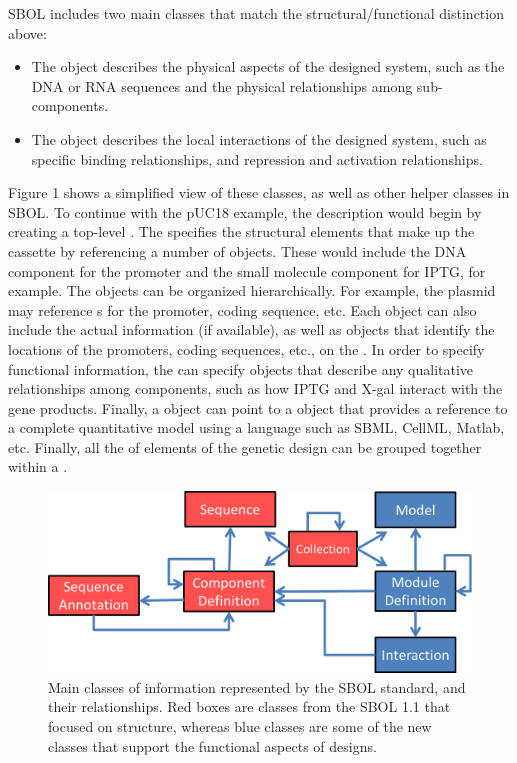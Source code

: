 SBOL includes two main classes that match the structural/functional distinction above:
\begin{itemize}
\item The  object describes the physical aspects of the designed system, such as the DNA or RNA sequences and the physical relationships among sub-components.
\item The  object describes the local interactions of the designed system, such as specific binding relationships, and repression and activation relationships. 
\end{itemize}

Figure 1 shows a simplified view of these classes, as well as other helper classes in SBOL. To continue with the pUC18 example, the description would begin by creating a top-level .  The  specifies the structural elements that make up the cassette by referencing a number of  objects. These would include the DNA component for the promoter and the small molecule component for IPTG, for example.  
The  objects can be organized hierarchically.  For example, the plasmid  may reference s for the promoter, coding sequence, etc.  
Each  object can also include the actual  information (if available), as well as  objects that identify the locations of the promoters, coding sequences, etc., on the .  
In order to specify functional information, the  can specify  objects that describe any qualitative relationships among components, such as how IPTG and X-gal interact with the gene products.  Finally, a  object can point to a  object that provides a reference to a complete quantitative model using a language such as SBML, CellML, Matlab, etc.  Finally, all the of elements of the genetic design can be grouped together within a .

\begin{figure}[ht]
\begin{center}
\includegraphics[scale=0.7]{images/OverviewFigforSpec-v7.png}
\caption{Main classes of information represented by the SBOL standard, and their relationships.  Red boxes are classes from the SBOL 1.1 that focused on structure, whereas blue classes are some of the new classes that support the functional aspects of designs.}
\label{images:overview1}
\end{center}
\end{figure}

